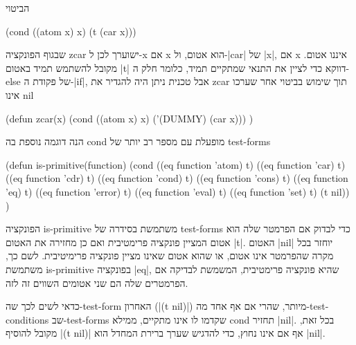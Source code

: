 \documentclass[a4paper,12pt,reqno]{article}
\begin{document}
הביטוי
\begin{LISP}
  (cond ((atom x) x) (t (car x)))
\end{LISP}
שבגוף הפונקציה zcar ישוערך לכן ל-x אם x הוא אטום, ול-\E|car| של \E|x|, אם x
איננו אטום. מקובל להשתמש תמיד באטום \E|t| דווקא כדי לציין את התנאי שמתקיים
תמיד, כלומר חלק ה-else של פקודת ה-\E|if|, אבל טכנית ניתן היה להגדיר את zcar תוך
שימוש בביטוי אחר שערכו אינו nil
\begin{LISP}
(defun zcar(x)
  (cond ((atom x) x) ('(DUMMY) (car x)))
)
\end{LISP}
הנה דוגמה נוספת בה cond מופעלת עם מספר רב יותר של test-forms
\begin{LISP}
(defun is-primitive(function)
  (cond
    ((eq function 'atom) t)
    ((eq function 'car) t)
    ((eq function 'cdr) t)
    ((eq function 'cond) t)
    ((eq function 'cons) t)
    ((eq function 'eq) t)
    ((eq function 'error) t)
    ((eq function 'eval) t)
    ((eq function 'set) t)
    (t nil))
)
\end{LISP}
הפונקציה is-primitive משתמשת בסידרה של test-forms כדי לבדוק אם הפרמטר שלה הוא
אטום המציין פונקציה פרימטיבית ואם כן מחזירה את האטום \E|t|. האטום \E|nil| יוחזר
בכל מקרה שהפרמטר אינו אטום, או שהוא אטום שאינו מציין פונקציה פרימיטיבית.
לשם כך, משתמשת is-primitive בפונקציה \T|eq|, שהיא פונקציה פרימטיבית, המשמשת
לבדיקה אם הפרמטרים שלה הם שני אטומים השווים זה לזה.

כדאי לשים לכך שה-test-form האחרון (\T|(t nil)|) מיותר, שהרי אם אף אחד
מה-test-conditions שב-test-forms שקדמו לו אינו מתקיים, ממילא cond
תחזיר \E|nil|. בכל זאת, מקובל להוסיף \T|(t nil)| אף אם אינו נחוץ, כדי להדגיש
שערך ברירת המחדל הוא \E|nil|.
\end{document}
